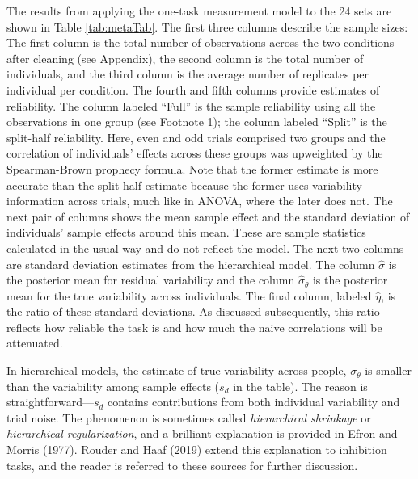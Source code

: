 \documentclass[
  english,
  ,man]{apa6}
\begin{document}
The results from applying the one-task measurement model to the 24 sets are shown in Table \ref{tab:metaTab}. The first three columns describe the sample sizes: The first column is the total number of observations across the two conditions after cleaning (see Appendix), the second column is the total number of individuals, and the third column is the average number of replicates per individual per condition. The fourth and fifth columns provide estimates of reliability. The column labeled ``Full'' is the sample reliability using all the observations in one group (see Footnote 1); the column labeled ``Split'' is the split-half reliability. Here, even and odd trials comprised two groups and the correlation of individuals' effects across these groups was upweighted by the Spearman-Brown prophecy formula. Note that the former estimate is more accurate than the split-half estimate because the former uses variability information across trials, much like in ANOVA, where the later does not. The next pair of columns shows the mean sample effect and the standard deviation of individuals' sample effects around this mean. These are sample statistics calculated in the usual way and do not reflect the model. The next two columns are standard deviation estimates from the hierarchical model. The column \(\hat{\sigma}\) is the posterior mean for residual variability and the column \(\hat{\sigma}_\theta\) is the posterior mean for the true variability across individuals. The final column, labeled \(\hat{\eta}\), is the ratio of these standard deviations. As discussed subsequently, this ratio reflects how reliable the task is and how much the naive correlations will be attenuated.

In hierarchical models, the estimate of true variability across people, \(\sigma_\theta\) is smaller than the variability among sample effects (\(s_d\) in the table). The reason is straightforward---\(s_d\) contains contributions from both individual variability and trial noise. The phenomenon is sometimes called \emph{hierarchical shrinkage} or \emph{hierarchical regularization}, and a brilliant explanation is provided in Efron and Morris (1977). Rouder and Haaf (2019) extend this explanation to inhibition tasks, and the reader is referred to these sources for further discussion.
\end{document}
